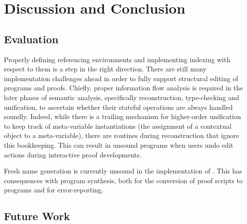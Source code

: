 \chapter{Discussion and Conclusion}


\section{Evaluation}


Properly defining referencing environments and implementing indexing with respect to them is a step in the right direction.
There are still many implementation challenges ahead in order to fully support structural editing of \Beluga programs and \Harpoon proofs.
Chiefly, proper information flow analysis is required in the later phases of semantic analysis, specifically reconstruction, type-checking and unification, to ascertain whether their stateful operations are always handled soundly.
Indeed, while there is a trailing mechanism for higher-order unification to keep track of meta-variable instantiations (the assignment of a contextual object to a meta-variable), there are routines during \LF reconstruction that ignore this bookkeeping.
This can result in unsound programs when users undo edit actions during interactive proof developments.

Fresh name generation is currently unsound in the implementation of \Beluga.
This has consequences with program synthesis, both for the conversion of \Harpoon proof scripts to \Beluga programs and for error-reporting.

\section{Future Work}



%
